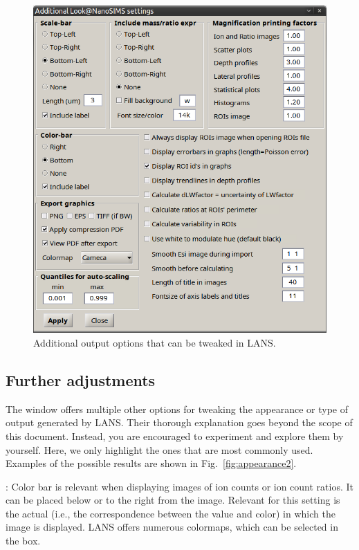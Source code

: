 \begin{figure}[!t]
\centering
\includegraphics[scale=0.35]{figs1/LANS-tweaking}
\caption{\label{fig:appearance}%
Additional output options that can be tweaked in LANS.}
\end{figure}

\subsection{Further adjustments}
\label{sec:appearance1}

The  window offers multiple other options for tweaking the appearance or type of output generated by LANS. Their thorough explanation goes beyond the scope of this document. Instead, you are encouraged to experiment and explore them by yourself. Here, we only highlight the ones that are most commonly used. Examples of the possible results are shown in Fig.~\ref{fig:appearance2}.

\bul {}: Color bar is relevant when displaying images of ion counts or ion count ratios. It can be placed below or to the right from the image. Relevant for this setting is the actual  (i.e., the correspondence between the value and color) in which the image is displayed. LANS offers numerous colormaps, which can be selected in the  box.


